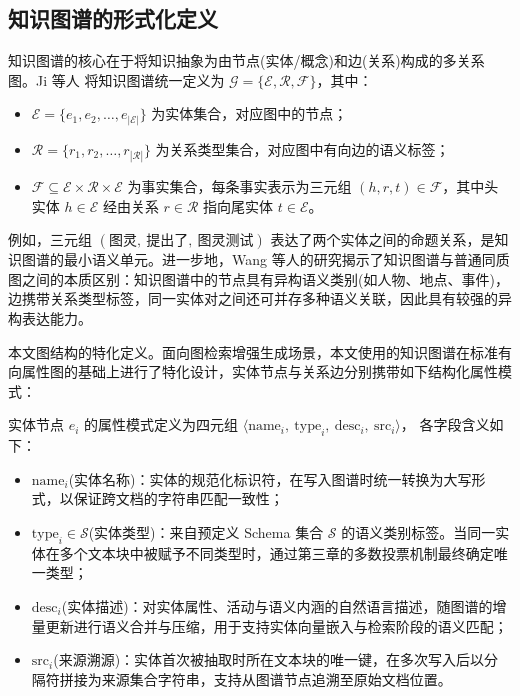 \documentclass[promaster, vlined]{DissertUESTC}
\begin{document}
\subsection{知识图谱的形式化定义}
知识图谱的核心在于将知识抽象为由节点(实体/概念)和边(关系)构成的多关系图。Ji 等人\cite{ji2021survey} 将知识图谱统一定义为 $\mathcal{G} = \{\mathcal{E}, \mathcal{R}, \mathcal{F}\}$，其中：

\begin{itemize}
    \item $\mathcal{E} = \{e_1, e_2, \dots, e_{|\mathcal{E}|}\}$ 为实体集合，对应图中的节点；
    \item $\mathcal{R} = \{r_1, r_2, \dots, r_{|\mathcal{R}|}\}$ 为关系类型集合，对应图中有向边的语义标签；
    \item $\mathcal{F} \subseteq \mathcal{E} \times \mathcal{R} \times \mathcal{E}$ 为事实集合，每条事实表示为三元组 $(h, r, t) \in \mathcal{F}$，其中头实体 $h \in \mathcal{E}$ 经由关系 $r \in \mathcal{R}$ 指向尾实体 $t \in \mathcal{E}$。
\end{itemize}

例如，三元组 $(\text{图灵},\ \text{提出了},\ \text{图灵测试})$ 表达了两个实体之间的命题关系，是知识图谱的最小语义单元。进一步地，Wang 等人的研究揭示了知识图谱与普通同质图之间的本质区别：知识图谱中的节点具有异构语义类别(如人物、地点、事件)，边携带关系类型标签，同一实体对之间还可并存多种语义关联，因此具有较强的异构表达能力。

本文图结构的特化定义。面向图检索增强生成场景，本文使用的知识图谱在标准有向属性图的基础上进行了特化设计，实体节点与关系边分别携带如下结构化属性模式：

实体节点 $e_i$ 的属性模式定义为四元组
$\langle \text{name}_i,\ \text{type}_i,\ \text{desc}_i,\ \text{src}_i \rangle$，
各字段含义如下：

\begin{itemize}
    \item $\text{name}_i$(实体名称)：实体的规范化标识符，在写入图谱时统一转换为大写形式，以保证跨文档的字符串匹配一致性；
    \item $\text{type}_i \in \mathcal{S}$(实体类型)：来自预定义 Schema 集合 $\mathcal{S}$ 的语义类别标签。当同一实体在多个文本块中被赋予不同类型时，通过第三章的多数投票机制最终确定唯一类型；
    \item $\text{desc}_i$(实体描述)：对实体属性、活动与语义内涵的自然语言描述，随图谱的增量更新进行语义合并与压缩，用于支持实体向量嵌入与检索阶段的语义匹配；
    \item $\text{src}_i$(来源溯源)：实体首次被抽取时所在文本块的唯一键，在多次写入后以分隔符拼接为来源集合字符串，支持从图谱节点追溯至原始文档位置。
\end{itemize}
\end{document}
